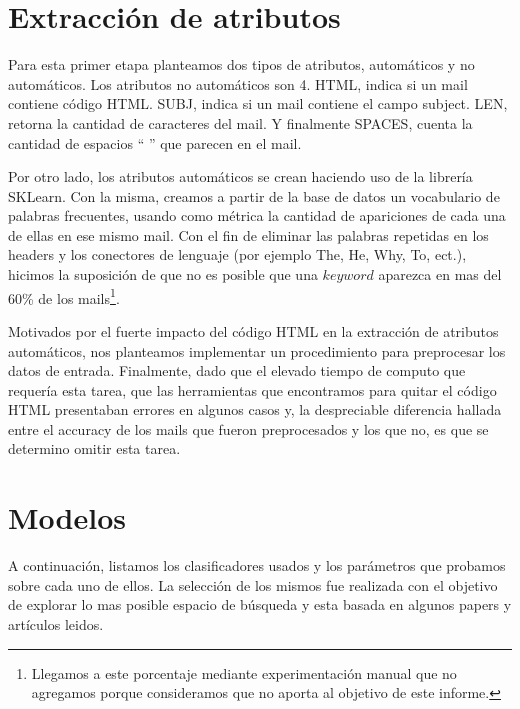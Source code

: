 \documentclass[hidelinks,a4paper,11pt, nofootinbib]{article}
\begin{document}
\maketitle

\section{Extracción de atributos}

Para esta primer etapa planteamos dos tipos de atributos, automáticos y no automáticos. Los atributos no automáticos son 4. HTML, indica si un mail 
contiene código HTML. SUBJ, indica si un mail contiene el campo subject. LEN, retorna la cantidad de caracteres del mail. Y finalmente SPACES, 
cuenta la cantidad de espacios `` '' que parecen en el mail.

Por otro lado, los atributos automáticos se crean haciendo uso de la librería SKLearn.
Con la misma, creamos a partir de la base de datos un vocabulario de palabras
frecuentes, usando como métrica la cantidad de apariciones de cada una de ellas en ese mismo mail. Con
el fin de eliminar las palabras repetidas en los headers y los conectores de lenguaje (por ejemplo The, He, Why, To, ect.), hicimos la suposición de que no es 
posible que una $keyword$ aparezca en mas del 60\% de los mails\footnote{Llegamos a este porcentaje mediante experimentación manual 
que no agregamos porque consideramos que no aporta al objetivo de este informe.}. 

Motivados por el fuerte impacto del código HTML en la extracción de atributos automáticos, nos planteamos implementar un procedimiento para preprocesar los datos de entrada.
Finalmente, dado que el elevado tiempo de computo que requería esta tarea, que las herramientas que encontramos para quitar el código HTML
presentaban errores en algunos casos y, la despreciable diferencia hallada entre el accuracy de los mails que fueron preprocesados y los que no, es que se 
determino omitir esta tarea.

\section{Modelos}


A continuación, listamos los clasificadores usados y los parámetros que probamos sobre cada uno de ellos. La selección de los mismos fue realizada con el objetivo de explorar lo mas 
posible espacio de búsqueda y esta basada en algunos papers y artículos leidos.
\end{document}
